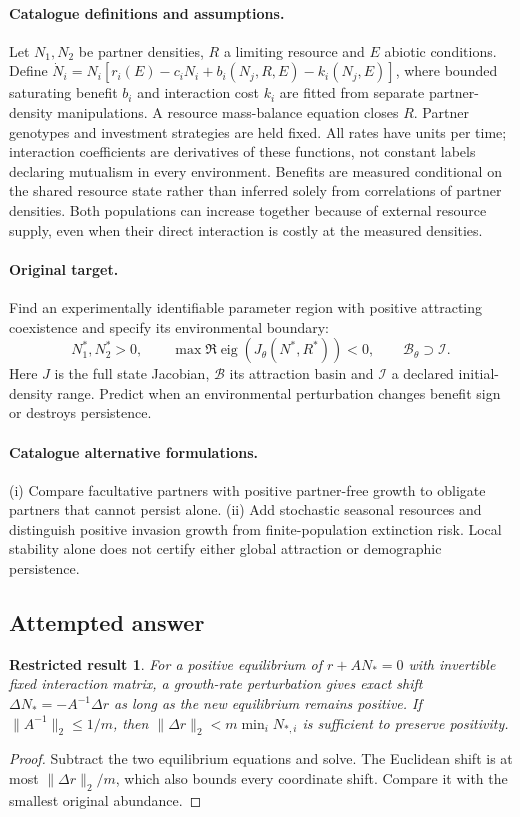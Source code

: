 \documentclass[11pt]{article}
\newtheorem{attemptresult}{Restricted result}[section]
\begin{document}
\paragraph{Catalogue definitions and assumptions.}
Let $N_1,N_2$ be partner densities, $R$ a limiting resource and $E$ abiotic conditions. Define $\dot N_i=N_i[r_i(E)-c_iN_i+b_i(N_j,R,E)-k_i(N_j,E)]$, where bounded saturating benefit $b_i$ and interaction cost $k_i$ are fitted from separate partner-density manipulations. A resource mass-balance equation closes $R$. Partner genotypes and investment strategies are held fixed. All rates have units per time; interaction coefficients are derivatives of these functions, not constant labels declaring mutualism in every environment. Benefits are measured conditional on the shared resource state rather than inferred solely from correlations of partner densities. Both populations can increase together because of external resource supply, even when their direct interaction is costly at the measured densities.
\paragraph{Original target.}
Find an experimentally identifiable parameter region with positive attracting coexistence and specify its environmental boundary:
\[
 N_1^*,N_2^*>0,\qquad
 \max\Re\operatorname{eig}(J_\theta(N^*,R^*))<0,
 \qquad \mathcal B_\theta\supset\mathcal I.
\]
Here $J$ is the full state Jacobian, $\mathcal B$ its attraction basin and $\mathcal I$ a declared initial-density range. Predict when an environmental perturbation changes benefit sign or destroys persistence.
\paragraph{Catalogue alternative formulations.}
(i) Compare facultative partners with positive partner-free growth to obligate partners that cannot persist alone. (ii) Add stochastic seasonal resources and distinguish positive invasion growth from finite-population extinction risk. Local stability alone does not certify either global attraction or demographic persistence.
\subsection{Attempted answer}
\begin{attemptresult}
For a positive equilibrium of $r+AN_*=0$ with invertible fixed interaction matrix, a growth-rate perturbation gives exact shift $\Delta N_*=-A^{-1}\Delta r$ as long as the new equilibrium remains positive. If $\|A^{-1}\|_2\leq1/m$, then $\|\Delta r\|_2<m\min_iN_{*,i}$ is sufficient to preserve positivity.
\end{attemptresult}
\begin{proof}
Subtract the two equilibrium equations and solve. The Euclidean shift is at most $\|\Delta r\|_2/m$, which also bounds every coordinate shift. Compare it with the smallest original abundance.
\end{proof}
\end{document}
